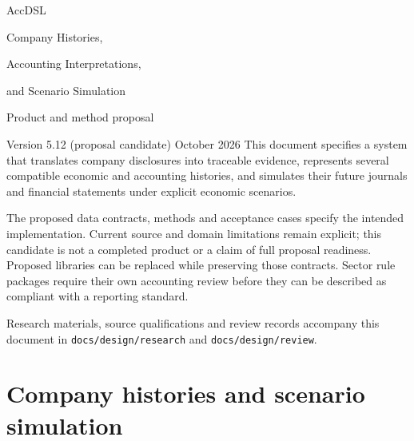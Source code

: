 \documentclass[11pt,a4paper]{report}
\newcommand{\code}[1]{\texttt{#1}}
\begin{document}
\hypersetup{pageanchor=false}
\begin{titlepage}
\vspace*{20mm}
{\sffamily\color{ink}\Huge AccDSL\par}
\vspace{7mm}
{\LARGE Company Histories,\par Accounting Interpretations,\par and Scenario Simulation\par}
\vspace{12mm}
{\Large Product and method proposal\par}
\vspace{5mm}
Version 5.12 (proposal candidate)  October 2026
\vfill
This document specifies a system that translates company disclosures into
traceable evidence, represents several compatible economic and accounting
histories, and simulates their future journals and financial statements under
explicit economic scenarios.

The proposed data contracts, methods and acceptance cases specify the intended
implementation. Current source and domain limitations remain explicit; this
candidate is not a completed product or a claim of full proposal readiness. Proposed libraries can be replaced while preserving those
contracts. Sector rule packages require their own accounting review before
they can be described as compliant with a reporting standard.

\vspace{8mm}
Research materials, source qualifications and review records accompany this
document in \code{docs/design/research} and \code{docs/design/review}.
\end{titlepage}
\hypersetup{pageanchor=true}
\tableofcontents
\clearpage{}
\part{Company histories and scenario simulation}


























\clearpage\label{sim:body-end}
\end{document}

